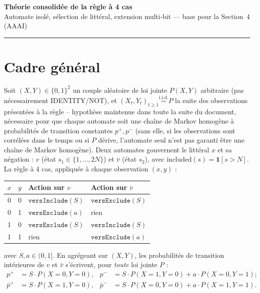\documentclass[12pt,a4paper]{article}
\theoremstyle{remark}
\newcommand{\vbar}{\bar{v}}
\begin{document}
\begin{center}
  {\LARGE\bfseries Théorie consolidée de la règle à 4 cas}\\[6pt]
  {\large Automate isolé, sélection de littéral, extension multi-bit --- base pour la Section~4 (AAAI)}
\end{center}
\vspace{0.5em}\hrule\vspace{1.5em}

\tableofcontents
\newpage

\section{Cadre général}

Soit $(X,Y)\in\{0,1\}^2$ un couple aléatoire de loi jointe $P(X,Y)$ arbitraire (pas
nécessairement IDENTITY/NOT), et $(X_t,Y_t)_{t\ge1}\overset{\text{i.i.d.}}{\sim}P$
la suite des observations présentées à la règle -- hypothèse maintenue dans
toute la suite du document, nécessaire pour que chaque automate soit une
chaîne de Markov homogène à probabilités de transition constantes $p^+,p^-$
(sans elle, si les observations sont corrélées dans le temps ou si $P$ dérive,
l'automate seul n'est pas garanti être une chaîne de Markov homogène). Deux
automates gouvernent le littéral $x$ et sa négation : $v$ (état
$s_1\in\{1,\ldots,2N\}$) et $\vbar$ (état $s_2$), avec
$\mathrm{included}(s)=\mathbf 1[s>N]$. La règle à 4 cas, appliquée à chaque
observation $(x,y)$ :

\begin{center}
\begin{tabular}{ccll}
\toprule
$x$ & $y$ & Action sur $v$ & Action sur $\vbar$ \\
\midrule
0 & 0 & $\texttt{versInclude}(S)$ & $\texttt{versExclude}(S)$ \\
0 & 1 & $\texttt{versExclude}(a)$ & rien \\
1 & 0 & $\texttt{versExclude}(S)$ & $\texttt{versInclude}(S)$ \\
1 & 1 & rien & $\texttt{versExclude}(a)$ \\
\bottomrule
\end{tabular}
\end{center}

avec $S,a\in(0,1]$. En agrégeant sur $(X,Y)$, les probabilités de transition
intérieures de $v$ et $\vbar$ s'écrivent, pour \emph{toute} loi jointe $P$ :
\begin{align}
  p^+ &= S\cdot P(X{=}0,Y{=}0), &
  p^- &= S\cdot P(X{=}1,Y{=}0) + a\cdot P(X{=}0,Y{=}1); \label{eq:pv}\\
  \bar p^+ &= S\cdot P(X{=}1,Y{=}0), &
  \bar p^- &= S\cdot P(X{=}0,Y{=}0) + a\cdot P(X{=}1,Y{=}1). \label{eq:pvbar}
\end{align}
\end{document}
